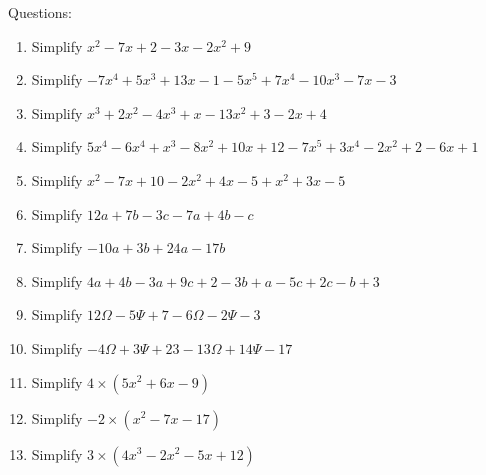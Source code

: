 \documentclass[16pt]{article}
\theoremstyle{remark}
\begin{document}
Questions:
\begin{enumerate}
\item Simplify $\displaystyle{x^2-7x+2 - 3x-2x^2+9}$
\vspace{3cm}

\item Simplify $\displaystyle{-7x^4+5x^3+13x-1 - 5x^5 +7x^4 - 10x^3 -7x-3}$

\newpage

\item Simplify $\displaystyle{x^3+2x^2-4x^3+x-13x^2+3-2x+4}$
\vspace{5cm}

\item Simplify $\displaystyle{5x^4-6x^4+x^3-8x^2+10x+12-7x^5+3x^4-2x^2+2-6x+1}$
\vspace{5cm}

\item Simplify $\displaystyle{x^2-7x+10-2x^2+4x-5+x^2+3x-5}$
\vspace{5cm}

\item Simplify $\displaystyle{12a+7b-3c - 7a+4b-c}$
\vspace{5cm}
\newpage
\item Simplify $\displaystyle{-10a+3b+24a-17b}$
\vspace{5cm}

\item Simplify $\displaystyle{4a+4b-3a+9c+2-3b+a-5c+2c-b+3}$
\vspace{5cm}

\item Simplify $\displaystyle{12\Omega-5\Psi +7 -6\Omega -2\Psi -3}$
\vspace{5cm}

\item Simplify $\displaystyle{-4\Omega+3\Psi +23 -13\Omega +14\Psi -17}$
\vspace{5cm}

\newpage

\item Simplify $\displaystyle{4\times(5x^2+6x-9)}$
\vspace{5cm}

\item Simplify $\displaystyle{-2\times(x^2-7x-17)}$
\vspace{5cm}


\item Simplify $\displaystyle{3\times(4x^3-2x^2-5x+12)}$
\vspace{5cm}


\end{enumerate}
\end{document}
